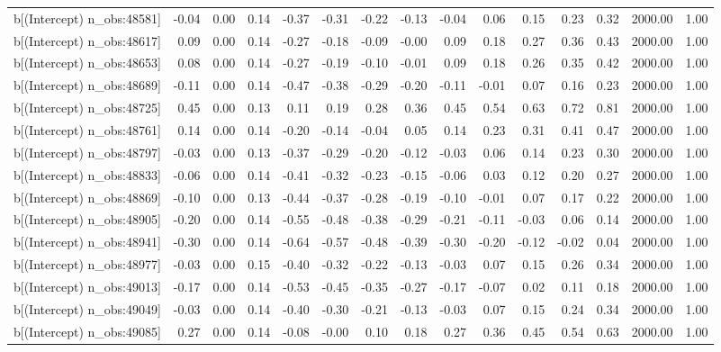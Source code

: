 \begin{table}[ht]
\begin{tabular}{rrrrrrrrrrrrrrr}
  b[(Intercept) n\_obs:48581] & -0.04 & 0.00 & 0.14 & -0.37 & -0.31 & -0.22 & -0.13 & -0.04 & 0.06 & 0.15 & 0.23 & 0.32 & 2000.00 & 1.00 \\ 
  b[(Intercept) n\_obs:48617] & 0.09 & 0.00 & 0.14 & -0.27 & -0.18 & -0.09 & -0.00 & 0.09 & 0.18 & 0.27 & 0.36 & 0.43 & 2000.00 & 1.00 \\ 
  b[(Intercept) n\_obs:48653] & 0.08 & 0.00 & 0.14 & -0.27 & -0.19 & -0.10 & -0.01 & 0.09 & 0.18 & 0.26 & 0.35 & 0.42 & 2000.00 & 1.00 \\ 
  b[(Intercept) n\_obs:48689] & -0.11 & 0.00 & 0.14 & -0.47 & -0.38 & -0.29 & -0.20 & -0.11 & -0.01 & 0.07 & 0.16 & 0.23 & 2000.00 & 1.00 \\ 
  b[(Intercept) n\_obs:48725] & 0.45 & 0.00 & 0.13 & 0.11 & 0.19 & 0.28 & 0.36 & 0.45 & 0.54 & 0.63 & 0.72 & 0.81 & 2000.00 & 1.00 \\ 
  b[(Intercept) n\_obs:48761] & 0.14 & 0.00 & 0.14 & -0.20 & -0.14 & -0.04 & 0.05 & 0.14 & 0.23 & 0.31 & 0.41 & 0.47 & 2000.00 & 1.00 \\ 
  b[(Intercept) n\_obs:48797] & -0.03 & 0.00 & 0.13 & -0.37 & -0.29 & -0.20 & -0.12 & -0.03 & 0.06 & 0.14 & 0.23 & 0.30 & 2000.00 & 1.00 \\ 
  b[(Intercept) n\_obs:48833] & -0.06 & 0.00 & 0.14 & -0.41 & -0.32 & -0.23 & -0.15 & -0.06 & 0.03 & 0.12 & 0.20 & 0.27 & 2000.00 & 1.00 \\ 
  b[(Intercept) n\_obs:48869] & -0.10 & 0.00 & 0.13 & -0.44 & -0.37 & -0.28 & -0.19 & -0.10 & -0.01 & 0.07 & 0.17 & 0.22 & 2000.00 & 1.00 \\ 
  b[(Intercept) n\_obs:48905] & -0.20 & 0.00 & 0.14 & -0.55 & -0.48 & -0.38 & -0.29 & -0.21 & -0.11 & -0.03 & 0.06 & 0.14 & 2000.00 & 1.00 \\ 
  b[(Intercept) n\_obs:48941] & -0.30 & 0.00 & 0.14 & -0.64 & -0.57 & -0.48 & -0.39 & -0.30 & -0.20 & -0.12 & -0.02 & 0.04 & 2000.00 & 1.00 \\ 
  b[(Intercept) n\_obs:48977] & -0.03 & 0.00 & 0.15 & -0.40 & -0.32 & -0.22 & -0.13 & -0.03 & 0.07 & 0.15 & 0.26 & 0.34 & 2000.00 & 1.00 \\ 
  b[(Intercept) n\_obs:49013] & -0.17 & 0.00 & 0.14 & -0.53 & -0.45 & -0.35 & -0.27 & -0.17 & -0.07 & 0.02 & 0.11 & 0.18 & 2000.00 & 1.00 \\ 
  b[(Intercept) n\_obs:49049] & -0.03 & 0.00 & 0.14 & -0.40 & -0.30 & -0.21 & -0.13 & -0.03 & 0.07 & 0.15 & 0.24 & 0.34 & 2000.00 & 1.00 \\ 
  b[(Intercept) n\_obs:49085] & 0.27 & 0.00 & 0.14 & -0.08 & -0.00 & 0.10 & 0.18 & 0.27 & 0.36 & 0.45 & 0.54 & 0.63 & 2000.00 & 1.00 \\ 

\end{tabular}
\end{table}
